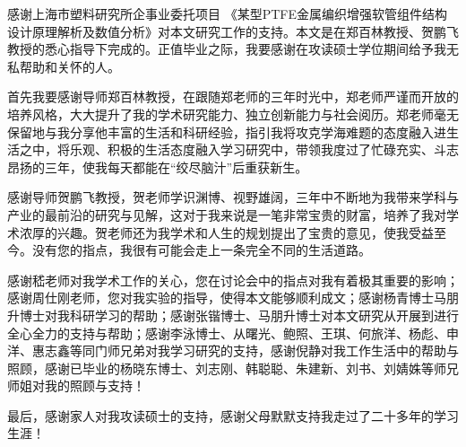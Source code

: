 
\begin{thanks}
感谢上海市塑料研究所企事业委托项目
《某型PTFE金属编织增强软管组件结构设计原理解析及数值分析》对本文研究工作的支持。本文是在郑百林教授、贺鹏飞教授的悉心指导下完成的。正值毕业之际，我要感谢在攻读硕士学位期间给予我无私帮助和关怀的人。

首先我要感谢导师郑百林教授，在跟随郑老师的三年时光中，郑老师严谨而开放的培养风格，大大提升了我的学术研究能力、独立创新能力与社会阅历。郑老师毫无保留地与我分享他丰富的生活和科研经验，指引我将攻克学海难题的态度融入进生活之中，将乐观、积极的生活态度融入学习研究中，带领我度过了忙碌充实、斗志昂扬的三年，使我每天都能在“绞尽脑汁”后重获新生。

感谢导师贺鹏飞教授，贺老师学识渊博、视野雄阔，三年中不断地为我带来学科与产业的最前沿的研究与见解，这对于我来说是一笔非常宝贵的财富，培养了我对学术浓厚的兴趣。贺老师还为我学术和人生的规划提出了宝贵的意见，使我受益至今。没有您的指点，我很有可能会走上一条完全不同的生活道路。

感谢嵇老师对我学术工作的关心，您在讨论会中的指点对我有着极其重要的影响；感谢周仕刚老师，您对我实验的指导，使得本文能够顺利成文；感谢杨青博士马朋升博士对我科研学习的帮助；感谢张锴博士、马朋升博士对本文研究从开展到进行全心全力的支持与帮助；感谢李泳博士、从曙光、鲍照、王琪、何旅洋、杨彪、申洋、惠志鑫等同门师兄弟对我学习研究的支持，感谢倪静对我工作生活中的帮助与照顾，感谢已毕业的杨晓东博士、刘志刚、韩聪聪、朱建新、刘书、刘婧姝等师兄师姐对我的照顾与支持！

最后，感谢家人对我攻读硕士的支持，感谢父母默默支持我走过了二十多年的学习生涯！

\end{thanks}
